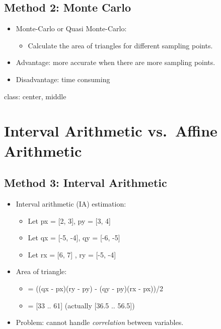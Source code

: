 \documentclass[
]{article}
\providecommand{\tightlist}{%
  \setlength{\itemsep}{0pt}\setlength{\parskip}{0pt}}
\begin{document}
\hypertarget{method-2-monte-carlo}{%
\subsection{Method 2: Monte Carlo}\label{method-2-monte-carlo}}

\begin{itemize}
\tightlist
\item
  Monte-Carlo or Quasi Monte-Carlo:

  \begin{itemize}
  \tightlist
  \item
    Calculate the area of triangles for different sampling points.
  \end{itemize}
\item
  Advantage: more accurate when there are more sampling points.
\item
  Disadvantage: time consuming
\end{itemize}

class: center, middle

\hypertarget{interval-arithmetic-vs.-affine-arithmetic}{%
\section{Interval Arithmetic vs.~Affine Arithmetic}\label{interval-arithmetic-vs.-affine-arithmetic}}

\hypertarget{method-3-interval-arithmetic}{%
\subsection{Method 3: Interval Arithmetic}\label{method-3-interval-arithmetic}}

\begin{itemize}
\tightlist
\item
  Interval arithmetic (IA) estimation:

  \begin{itemize}
  \tightlist
  \item
    Let px = {[}2, 3{]}, py = {[}3, 4{]}
  \item
    Let qx = {[}-5, -4{]}, qy = {[}-6, -5{]}
  \item
    Let rx = {[}6, 7{]} , ry = {[}-5, -4{]}
  \end{itemize}
\item
  Area of triangle:

  \begin{itemize}
  \tightlist
  \item
    = ((qx - px)(ry - py) - (qy - py)(rx - px))/2
  \item
    = {[}33 .. 61{]} (actually {[}36.5 .. 56.5{]})
  \end{itemize}
\item
  Problem: cannot handle \emph{correlation} between variables.
\end{itemize}
\end{document}
